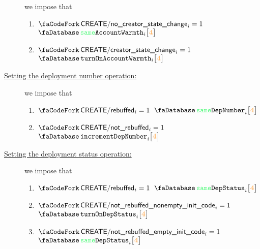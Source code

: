 \begin{description}
		we impose that
		\begin{enumerate}
			\item \If $\scenCreateNoCreatorStateChange _{i} = 1$ \Then $\accSameWarmth   {i}{\createFirstCreateeAccountRowOffset}$
			\item \If $\scenCreateCreatorStateChange   _{i} = 1$ \Then $\accTurnOnWarmth {i}{\createFirstCreateeAccountRowOffset}$
		\end{enumerate}
	\item[\underline{Setting the deployment number operation:}]
		we impose that
		\begin{enumerate}
			\item \If $\scenCreateRebuffed    _{i} = 1$ \Then $\accSameDeploymentNumber       {i}{\createFirstCreateeAccountRowOffset}$
			\item \If $\scenCreateNotRebuffed _{i} = 1$ \Then $\accIncrementDeploymentNumber  {i}{\createFirstCreateeAccountRowOffset}$
		\end{enumerate}
	\item[\underline{Setting the deployment status operation:}]
		we impose that
		\begin{enumerate}
			\item \If $\scenCreateRebuffed    _{i} = 1$ \Then $\accSameDeploymentStatus       {i}{\createFirstCreateeAccountRowOffset}$
			\item \If $\scenCreateExecutionNonEmptyInitCode _{i} = 1$ \Then $\accTurnOnDepStatus {i}{\createFirstCreateeAccountRowOffset}$
			\item \If $\scenCreateExecutionEmptyInitCode    _{i} = 1$ \Then $\accSameDeploymentStatus   {i}{\createFirstCreateeAccountRowOffset}$
		\end{enumerate}
\end{description}

